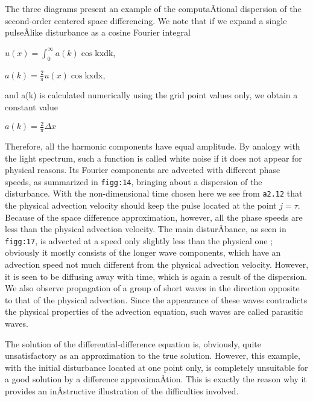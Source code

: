 \begin{figure}
\centering
{}
\caption{}
\end{figure}

The three diagrams present an example of the computaÂ­tional dispersion
of the second-order centered space differencing. We note that if we
expand a single pulseÂ­like disturbance as a cosine Fourier integral

\(u\left( x \right) = \int_{0}^{\infty}{a\left( k \right)\cos\text{kxdk}}\),

\(a\left( k \right) = \frac{2}{\pi}u\left( x \right)\cos\text{kxdx}\),

and a(k) is calculated numerically using the grid point values only, we
obtain a constant value

\(a\left( k \right) = \frac{2}{\pi}\Delta x\)

Therefore, all the harmonic components have equal amplitude. By analogy
with the light spectrum, such a function is called white noise if it
does not appear for physical reasons. Its Fourier components are
advected with different phase speeds, as summarized in \texttt{figg:14},
bringing about a dispersion of the disturbance. With the non-dimensional
time chosen here we see from \texttt{a2.12} that the physical advection
velocity should keep the pulse located at the point \(j = \tau.\)
Because of the space difference approximation, however, all the phase
speeds are less than the physical advection velocity. The main
disturÂ­bance, as seen in \texttt{figg:17}, is advected at a speed only
slightly less than the physical one ; obviously it mostly consists of
the longer wave components, which have an advection speed not much
different from the physical advection velocity. However, it is seen to
be diffusing away with time, which is again a result of the dispersion.
We also observe propagation of a group of short waves in the direction
opposite to that of the physical advection. Since the appearance of
these waves contradicts the physical properties of the advection
equation, such waves are called parasitic waves.

The solution of the differential-difference equation is, obviously,
quite unsatisfactory as an approximation to the true solution. However,
this example, with the initial disturbance located at one point only, is
completely unsuitable for a good solution by a difference
approximaÂ­tion. This is exactly the reason why it provides an
inÂ­structive illustration of the difficulties involved.

